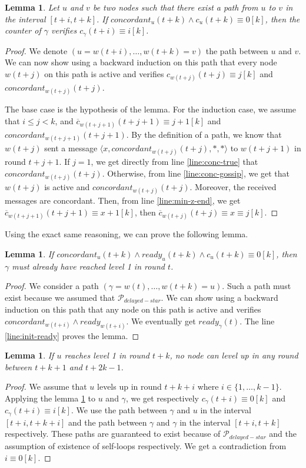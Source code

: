 \documentclass[11pt,letterpaper]{article}
\renewcommand{\leq}{\leqslant}
\newtheorem{lem}[thm]{Lemma}
\newcommand{\cent}{\gamma}
\begin{document}
\begin{lem} \label{lem:conc-safety}
	Let $u$ and $v$ be two nodes such that there exist a path from $u$ to $v$ in the interval $[t+i,t+k]$.
	If $concordant_u(t+k) \wedge c_u(t+k) \equiv 0 [k]$, then the counter of $\cent$ verifies $c_\cent(t+i) \equiv i [k]$.
\end{lem}
\begin{proof}
	We denote $(u = w(t+i), \dots, w(t+k) = v)$ the path between $u$ and $v$.
	We can now show using a backward induction on this path that every node $w(t+j)$ on this path is active and verifies $c_{w(t+j)}(t+j) \equiv j [k]$ and $concordant_{w(t+j)}(t+j)$.

	The base case is the hypothesis of the lemma.
	For the induction case, we assume that $i \leq j < k$, and $\overline{c}_{w(t+j+1)}(t+j+1) \equiv j+1 [k]$ and $concordant_{w(t+j+1)}(t+j+1)$.
	By the definition of a path, we know that $w(t+j)$ sent a message $\langle x, concordant_{w(t+j)}(t+j), *, * \rangle$ to $w(t+j+1)$ in round $t+j+1$.
	If $j = 1$, we get directly from line \ref{line:conc-true} that $concordant_{w(t+j)}(t+j)$.
	Otherwise, from line \ref{line:conc-gossip}, we get that $w(t+j)$ is active and $concordant_{w(t+j)}(t+j)$. Moreover, the received messages are concordant.
	Then, from line \ref{line:min-z-end}, we get $\overline{c}_{w(t+j+1)}(t+j+1) \equiv x+1 [k]$, then $\overline{c}_{w(t+j)}(t+j) \equiv x \equiv j [k]$.
\end{proof}

\noindent Using the exact same reasoning, we can prove the following lemma.
\begin{lem} \label{lem:conc-safety-bis}
	If $concordant_u(t+k) \wedge ready_u(t+k) \wedge c_u(t+k) \equiv 0 [k]$, then $\cent$ must already have reached level 1 in round $t$.
\end{lem}
\begin{proof}
	We consider a path $(\cent = w(t), \dots, w(t+k) = u)$. Such a path must exist because we assumed that $\mathcal{P}_{delayed-star}$.
	We can show using a backward induction on this path that any node on this path is active and verifies $concordant_{w(t+i)} \wedge ready_{w(t+i)}$.
	We eventually get $ready_\cent(t)$. The line \ref{line:init-ready} proves the lemma.
\end{proof}

\begin{lem} \label{lem:no-close-level2}
	If $u$ reaches level 1 in round $t+k$, no node can level up in any round between $t+k+1$ and $t+2k-1$.
\end{lem}
\begin{proof}
	We assume that $u$ levels up in round $t+k+i$ where $i \in \{1, \dots, k-1\}$.
	Applying the lemma \ref{lem:conc-safety} to $u$ and $\cent$, we get respectively $c_\cent(t+i) \equiv 0 [k]$ and $c_\cent(t+i) \equiv i [k]$.
	We use the path between $\cent$ and $u$ in the interval $[t+i,t+k+i]$ and the path between $\cent$ and $\cent$ in the interval $[t+i,t+k]$ respectively.
	These paths are guaranteed to exist because of $\mathcal{P}_{delayed-star}$ and the assumption of existence of self-loops respectively.
	We get a contradiction from $i \equiv 0 [k]$.
\end{proof}
\end{document}
